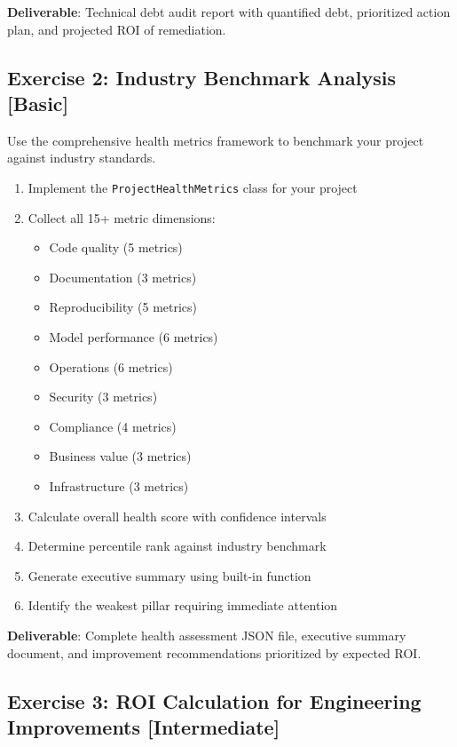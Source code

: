 \textbf{Deliverable}: Technical debt audit report with quantified debt, prioritized action plan, and projected ROI of remediation.

\subsection{Exercise 2: Industry Benchmark Analysis [Basic]}

Use the comprehensive health metrics framework to benchmark your project against industry standards.

\begin{enumerate}
    \item Implement the \texttt{ProjectHealthMetrics} class for your project
    \item Collect all 15+ metric dimensions:
        \begin{itemize}
            \item Code quality (5 metrics)
            \item Documentation (3 metrics)
            \item Reproducibility (5 metrics)
            \item Model performance (6 metrics)
            \item Operations (6 metrics)
            \item Security (3 metrics)
            \item Compliance (4 metrics)
            \item Business value (3 metrics)
            \item Infrastructure (3 metrics)
        \end{itemize}
    \item Calculate overall health score with confidence intervals
    \item Determine percentile rank against industry benchmark
    \item Generate executive summary using built-in function
    \item Identify the weakest pillar requiring immediate attention
\end{enumerate}

\textbf{Deliverable}: Complete health assessment JSON file, executive summary document, and improvement recommendations prioritized by expected ROI.

\subsection{Exercise 3: ROI Calculation for Engineering Improvements [Intermediate]}

